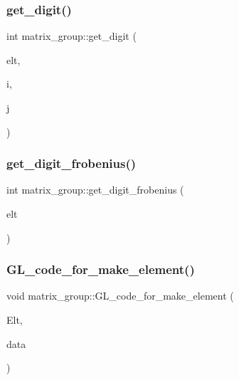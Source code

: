 \mbox{\label{classmatrix__group_ab73d77695beeb972d573910eae4014a8}} 
\subsubsection{\texorpdfstring{get\+\_\+digit()}{get\_digit()}}
{\footnotesize\ttfamily int matrix\+\_\+group\+::get\+\_\+digit (\begin{DoxyParamCaption}\item[{\mbox{\hyperlink{galois_8h_a122c4acf389c050379f00341fdcd5812}{U\+B\+Y\+TE}} $\ast$}]{elt,  }\item[{\mbox{\hyperlink{galois_8h_a09fddde158a3a20bd2dcadb609de11dc}{I\+NT}}}]{i,  }\item[{\mbox{\hyperlink{galois_8h_a09fddde158a3a20bd2dcadb609de11dc}{I\+NT}}}]{j }\end{DoxyParamCaption})}

\mbox{\label{classmatrix__group_acb2f28db6ae01a524b6d4c51ad587f4b}} 
\subsubsection{\texorpdfstring{get\+\_\+digit\+\_\+frobenius()}{get\_digit\_frobenius()}}
{\footnotesize\ttfamily int matrix\+\_\+group\+::get\+\_\+digit\+\_\+frobenius (\begin{DoxyParamCaption}\item[{\mbox{\hyperlink{galois_8h_a122c4acf389c050379f00341fdcd5812}{U\+B\+Y\+TE}} $\ast$}]{elt }\end{DoxyParamCaption})}

\mbox{\label{classmatrix__group_ab7e784e8a49778919a83c9db94906180}} 
\subsubsection{\texorpdfstring{G\+L\+\_\+code\+\_\+for\+\_\+make\+\_\+element()}{GL\_code\_for\_make\_element()}}
{\footnotesize\ttfamily void matrix\+\_\+group\+::\+G\+L\+\_\+code\+\_\+for\+\_\+make\+\_\+element (\begin{DoxyParamCaption}\item[{\mbox{\hyperlink{galois_8h_a09fddde158a3a20bd2dcadb609de11dc}{I\+NT}} $\ast$}]{Elt,  }\item[{\mbox{\hyperlink{galois_8h_a09fddde158a3a20bd2dcadb609de11dc}{I\+NT}} $\ast$}]{data }\end{DoxyParamCaption})}

